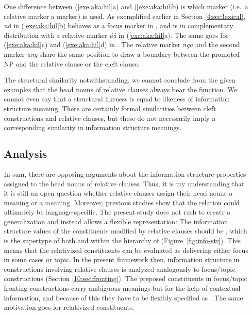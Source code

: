 \noindent One difference between (\ref{exe:aka:hil}a) and
(\ref{exe:aka:hil}b) is which marker (i.e.\ a relative marker \vs a
 marker) is used. As exemplified earlier in
Section \ref{4:sec:lexical}, \textit{n\`{a}} in (\ref{exe:aka:hil}b) behaves
as a focus marker in , and is in complementary distribution
with a relative marker \textit{\'{a}\`{a}} in
(\ref{exe:aka:hil}a). The same goes for (\ref{exe:aka:hil}c) and
(\ref{exe:aka:hil}d) in . The
relative marker \textit{nga} and the second  marker \textit{ang}
share the same position to draw a boundary between the promoted NP and
the relative clause or the cleft clause.




The structural similarity notwithstanding, we
cannot conclude from the given examples that the head nouns of
relative clauses always bear the  function. We cannot even say
that a structural likeness is equal to likeness of information
structure meaning. There are certainly formal
similarities between cleft constructions and relative clauses, but
these do not necessarily imply a corresponding similarity in
information structure meanings.



\subsection{Analysis}
\label{10:ssec:relative:analysis}

In sum, there are opposing arguments about the information structure
properties assigned to the head nouns of relative clauses. Thus, it is
my understanding that it is still an open question whether relative
clauses assign their head nouns a  meaning or a 
meaning. Moreover, previous studies show that the relation could
ultimately be language-specific. The present study
does not rush to create a generalization and instead allows a flexible
representation: The information structure values of the constituents
modified by relative clauses should be , which is
the supertype of both  and  within the hierarchy
of  (Figure~\ref{fig:info-str}). This means that the
relativized constituents can be evaluated as delivering either focus
in some cases or topic. In the present framework then, information
structure in constructions involving relative clauses is analyzed
analogously to focus/topic  constructions
(Section \ref{10:sec:fronting}). The preposed constituents in focus/topic
fronting constructions carry ambiguous meanings but for the help of
contextual information, and because of this they have to be flexibly
specified as . The same motivation goes for
relativized constituents.



